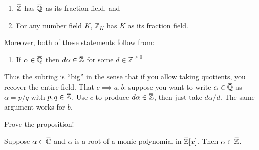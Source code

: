 \begin{proposition}[$\ff(\ZZ_K) = K$ ]

\envlist

\begin{enumerate}
\def\labelenumi{\alph{enumi}.}
\tightlist
\item
  \(\mkern 1.5mu\overline{\mkern-1.5mu{\mathbb{Z}}\mkern-1.5mu}\mkern 1.5mu\)
  has
  \(\mkern 1.5mu\overline{\mkern-1.5mu{\mathbb{Q}}\mkern-1.5mu}\mkern 1.5mu\)
  as its fraction field, and
\item
  For any number field \(K\), \({\mathbb{Z}}_K\) has \(K\) as its
  fraction field.
\end{enumerate}

Moreover, both of these statements follow from:

\begin{enumerate}
\def\labelenumi{\alph{enumi}.}
\setcounter{enumi}{2}
\tightlist
\item
  If
  \(\alpha\in \mkern 1.5mu\overline{\mkern-1.5mu{\mathbb{Q}}\mkern-1.5mu}\mkern 1.5mu\)
  then
  \(d \alpha\in \mkern 1.5mu\overline{\mkern-1.5mu{\mathbb{Z}}\mkern-1.5mu}\mkern 1.5mu\)
  for some \(d\in {\mathbb{Z}}^{\geq 0}\)
\end{enumerate}

\end{proposition}

\begin{remark}

Thus the subring is ``big'' in the sense that if you allow taking
quotients, you recover the entire field. That \(c\implies a,b\): suppose
you want to write
\(\alpha \in \mkern 1.5mu\overline{\mkern-1.5mu{\mathbb{Q}}\mkern-1.5mu}\mkern 1.5mu\)
as \(\alpha=p/q\) with
\(p,q \in \mkern 1.5mu\overline{\mkern-1.5mu{\mathbb{Z}}\mkern-1.5mu}\mkern 1.5mu\).
Use \(c\) to produce
\(d\alpha\in \mkern 1.5mu\overline{\mkern-1.5mu{\mathbb{Z}}\mkern-1.5mu}\mkern 1.5mu\),
then just take \(d\alpha /d\). The same argument works for \(b\).

\end{remark}

\begin{exercise}[?]

Prove the proposition!

\end{exercise}

\begin{proposition}[?]

Suppose
\(\alpha\in \mkern 1.5mu\overline{\mkern-1.5mu{\mathbb{C}}\mkern-1.5mu}\mkern 1.5mu\)
and \(\alpha\) is a root of a monic polynomial in
\(\mkern 1.5mu\overline{\mkern-1.5mu{\mathbb{Z}}\mkern-1.5mu}\mkern 1.5mu [x]\).
Then
\(\alpha\in \mkern 1.5mu\overline{\mkern-1.5mu{\mathbb{Z}}\mkern-1.5mu}\mkern 1.5mu\).

\end{proposition}

